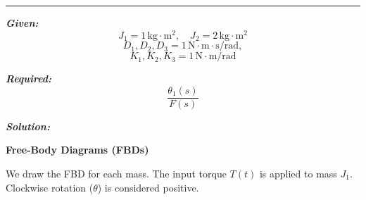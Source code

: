 \documentclass[11pt]{article}
\begin{document}
\noindent\rule{\textwidth}{1pt}

\vspace{12pt}


\noindent\textbf{\textit{Given:}}
\[
J_1 = 1\, \text{kg}\cdot\text{m}^2, \quad J_2 = 2\, \text{kg}\cdot\text{m}^2
\]
\[
D_1,D_2,D_3 = 1\, \text{N}\cdot\text{m}\cdot\text{s/rad}, 
\]
\[
K_1,K_2,K_3 = 1\, \text{N}\cdot\text{m/rad} 
\]

\vspace{1em}
\noindent

\noindent\textbf{\textit{Required:}}
\[
\frac{\theta_1(s)}{F(s)}
\]

\vspace{1.5em}
\noindent\textbf{\textit{Solution:}}

\vspace{8pt}

\noindent\textbf{Free-Body Diagrams (FBDs)}
\vspace{5pt}

\noindent We draw the FBD for each mass. The input torque $T(t)$ is applied to mass $J_1$. Clockwise rotation ($\theta$) is considered positive.
\end{document}

